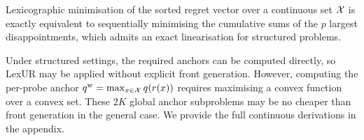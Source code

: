 \begin{proposition}
Lexicographic minimisation of the sorted regret vector over a continuous set $\mathcal{X}$ is exactly equivalent to sequentially minimising the cumulative sums of the $p$ largest disappointments, which admits an exact linearisation for structured problems.
\end{proposition}

\begin{remark}
Under structured settings, the required anchors can be computed directly, so LexUR may be applied without explicit front generation. However, computing the per-probe anchor $q^{\mathrm w} = \max_{x \in \mathcal{X}} q(r(x))$ requires maximising a convex function over a convex set. These $2K$ global anchor subproblems may be no cheaper than front generation in the general case. We provide the full continuous derivations in the appendix.
\end{remark}
